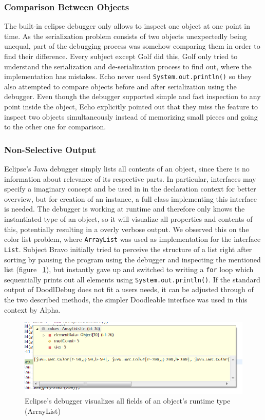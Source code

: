 \documentclass{acm_proc_article-sp}
\newcommand{\nb}[2]{\nbc{#1}{#2}{orange}}
\newcommand\todo[1]{\nb{TO DO}{#1}}
\begin{document}
\subsubsection{Comparison Between Objects}
The built-in eclipse debugger only allows to inspect one object at one point in time. As the serialization problem consists of two objects unexpectedly  being unequal, part of the debugging process was somehow comparing them in order to find their difference. Every subject except Golf did this, Golf only tried to understand the serialization and de-serialization process to find out, where the implementation has mistakes. Echo never used \verb-System.out.println()- so they also attempted to compare objects before and after serialization using the debugger. Even though the debugger supported simple and fast inspection to any point inside the object, Echo explicitly pointed out that they miss the feature to inspect two objects simultaneously instead of memorizing small pieces and going to the other one for comparison.

\subsubsection{Non-Selective Output}
Eclipse's Java debugger simply lists all contents of an object, since there is no information about relevance of its respective parts. In particular, interfaces may specify a imaginary concept and be used in in the declaration context for better overview, but for creation of an instance, a full class implementing this interface is needed. The debugger is working at runtime and therefore only knows the instantiated type of an object, so it will visualize all properties and contents of this, potentially resulting in a overly verbose output. We observed this on the color list problem, where \verb.ArrayList. was used as implementation for the interface \verb.List.. Subject Bravo initially tried to perceive the structure of a list right after sorting by pausing the program  using the debugger and inspecting the mentioned list (figure ~\ref{debugger_color-list}), but instantly gave up and switched to writing a \verb.for. loop which sequentially prints out all elements using \verb-System.out.println()-. If the standard output of DoodlDebug does not fit a users needs, it can be adjusted through of the two described methods, the simpler Doodleable interface was used in this context by Alpha. \todo{Screenshot of Doodleable usage}
\begin{figure}[h]
	\includegraphics[width=\textwidth]{img/debugger_color-list_remo.png}
	\caption[Bravo using the debugger for a color list]{Eclipse's debugger visualizes all fields of an object's runtime type (ArrayList)}
	\label{debugger_color-list}
\end{figure}
\end{document}
